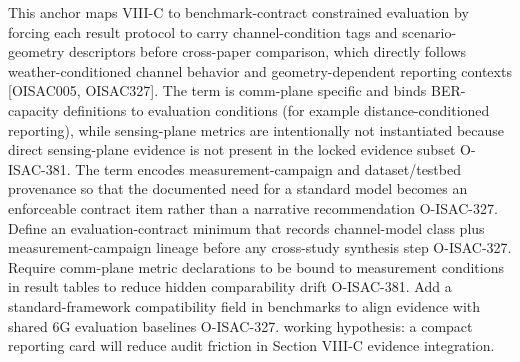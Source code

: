 {}This anchor maps VIII-C to benchmark-contract constrained evaluation by forcing each result protocol to carry channel-condition tags and scenario-geometry descriptors before cross-paper comparison, which directly follows weather-conditioned channel behavior and geometry-dependent reporting contexts [O\markdownRendererUnderscore{}ISAC\markdownRendererUnderscore{}005, O\markdownRendererUnderscore{}ISAC\markdownRendererUnderscore{}327]. The term  is comm-plane specific and binds BER-capacity definitions to evaluation conditions (for example distance-conditioned reporting), while sensing-plane metrics are intentionally not instantiated because direct sensing-plane evidence is not present in the locked evidence subset O-ISAC-381. The term  encodes measurement-campaign and dataset/testbed provenance so that the documented need for a standard model becomes an enforceable contract item rather than a narrative recommendation O-ISAC-327.\markdownRendererInterblockSeparator
{}
\markdownRendererSectionEnd \markdownRendererSectionBegin
{}\markdownRendererInterblockSeparator
{}\markdownRendererUlBeginTight
\markdownRendererUlItem Define an evaluation-contract minimum that records channel-model class plus measurement-campaign lineage before any cross-study synthesis step O-ISAC-327.\markdownRendererUlItemEnd 
\markdownRendererUlItem Require comm-plane metric declarations to be bound to measurement conditions in result tables to reduce hidden comparability drift O-ISAC-381.\markdownRendererUlItemEnd 
\markdownRendererUlItem Add a standard-framework compatibility field in benchmarks to align evidence with shared 6G evaluation baselines O-ISAC-327.\markdownRendererUlItemEnd 
\markdownRendererUlItem working hypothesis: a compact reporting card will reduce audit friction in Section VIII-C evidence integration.\markdownRendererUlItemEnd 
\markdownRendererUlEndTight \markdownRendererInterblockSeparator
{}
\markdownRendererSectionEnd 
\markdownRendererSectionEnd \markdownRendererSectionBegin
{}\markdownRendererInterblockSeparator
{}\markdownRendererSectionBegin
{}\markdownRendererInterblockSeparator
